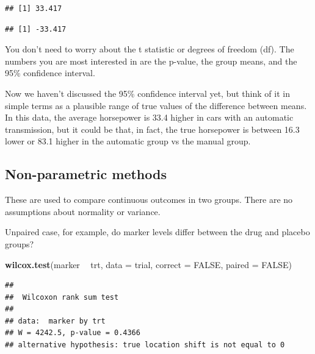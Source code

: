 \documentclass[]{book}
\newenvironment{Shaded}{\begin{snugshade}}{\end{snugshade}}
\newcommand{\DataTypeTok}[1]{\textcolor[rgb]{0.13,0.29,0.53}{#1}}
\newcommand{\DecValTok}[1]{\textcolor[rgb]{0.00,0.00,0.81}{#1}}
\newcommand{\KeywordTok}[1]{\textcolor[rgb]{0.13,0.29,0.53}{\textbf{#1}}}
\newcommand{\NormalTok}[1]{#1}
\newcommand{\OperatorTok}[1]{\textcolor[rgb]{0.81,0.36,0.00}{\textbf{#1}}}
\newcommand{\OtherTok}[1]{\textcolor[rgb]{0.56,0.35,0.01}{#1}}
\newcommand{\StringTok}[1]{\textcolor[rgb]{0.31,0.60,0.02}{#1}}
\begin{document}
\begin{verbatim}
## [1] 33.417
\end{verbatim}

\begin{Shaded}
\end{Shaded}

\begin{verbatim}
## [1] -33.417
\end{verbatim}

You don't need to worry about the t statistic or degrees of freedom
(df). The numbers you are most interested in are the p-value, the group
means, and the 95\% confidence interval.

Now we haven't discussed the 95\% confidence interval yet, but think of
it in simple terms as a plausible range of true values of the difference
between means. In this data, the average horsepower is 33.4 higher in
cars with an automatic transmission, but it could be that, in fact, the
true horsepower is between 16.3 lower or 83.1 higher in the automatic
group vs the manual group.

\hypertarget{non-parametric-methods}{%
\subsection{\texorpdfstring{\textbf{Non-parametric
methods}}{Non-parametric methods}}\label{non-parametric-methods}}

These are used to compare continuous outcomes in two groups. There are
no assumptions about normality or variance.

Unpaired case, for example, do marker levels differ between the drug and
placebo groups?

\begin{Shaded}
\begin{Highlighting}[]
\KeywordTok{wilcox.test}\NormalTok{(marker }\OperatorTok{~}\StringTok{ }\NormalTok{trt, }\DataTypeTok{data =}\NormalTok{ trial, }\DataTypeTok{correct =} \OtherTok{FALSE}\NormalTok{, }\DataTypeTok{paired =} \OtherTok{FALSE}\NormalTok{)}
\end{Highlighting}
\end{Shaded}

\begin{verbatim}
## 
##  Wilcoxon rank sum test
## 
## data:  marker by trt
## W = 4242.5, p-value = 0.4366
## alternative hypothesis: true location shift is not equal to 0
\end{verbatim}
\end{document}
